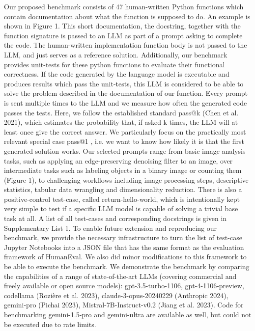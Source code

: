 \documentclass{ecai}
\begin{document}
Our proposed benchmark consists of 47 human-written Python functions which contain documentation about what the function is supposed to do. An example is shown in Figure 1. This short documentation, the docstring, together with the function signature is passed to an LLM as part of a prompt asking to complete the code. The human-written implementation function body is not passed to the LLM, and just serves as a reference  solution. Additionally, our benchmark provides unit-tests for these python functions to evaluate their functional correctness. If the code generated by  the language model is executable and produces results which pass the unit-tests, this LLM is considered to be able to solve the problem described in the documentation of our function. Every prompt is sent multiple times to the LLM and we measure how often the generated  code passes the tests. Here, we follow the established standard pass@k (Chen et al. 2021), which estimates the probability that, if asked k times, the LLM will at least once give the correct answer. We particularly focus on the practically most relevant special case pass@1 , i.e. we want to know how likely it is that the first generated solution works.  
Our selected prompts range from basic image analysis tasks, such as applying an edge-preserving denoising filter to an image, over intermediate tasks such as labeling objects in a binary image or counting them (Figure 1), to challenging workflows including image processing steps, descriptive statistics, tabular data wrangling and dimensionality reduction. There is also a positive-control test-case, called return-hello-world, which is intentionally kept very simple to test if a specific LLM model is  capable of solving a trivial base task at all. A list of all test-cases and corresponding docstrings is given in Supplementary List 1.
To enable future extension and reproducing our benchmark, we provide the necessary infrastructure to turn the list of test-case Jupyter Notebooks into a JSON file that has the same format as the evaluation framework of HumanEval. We also did minor modifications to this framework to be able to execute the benchmark.
We demonstrate the benchmark by comparing the capabilities of a range of state-of-the-art  LLMs (covering commercial and freely available or open source models): gpt-3.5-turbo-1106, gpt-4-1106-preview, codellama (Rozière et al. 2023), claude-3-opus-20240229 (Anthropic 2024), gemini-pro (Pichai 2023),  Mistral-7B-Instruct-v0.2 (Jiang et al. 2023). Code for benchmarking gemini-1.5-pro and gemini-ultra are available as well, but could not be executed due to rate limits. 
\end{document}

